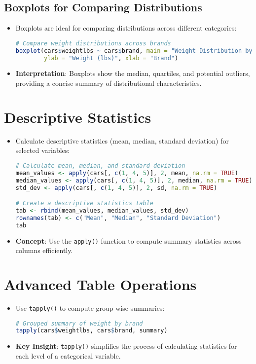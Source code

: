 \subsection{Boxplots for Comparing Distributions}
\begin{itemize}
    \item Boxplots are ideal for comparing distributions across different categories:
\begin{lstlisting}[language=R]
# Compare weight distributions across brands
boxplot(cars$weightlbs ~ cars$brand, main = "Weight Distribution by Brand",
        ylab = "Weight (lbs)", xlab = "Brand")
\end{lstlisting}
    \item \textbf{Interpretation}: Boxplots show the median, quartiles, and potential outliers, providing a concise summary of distributional characteristics.
\end{itemize}

\section{Descriptive Statistics}
\begin{itemize}
    \item Calculate descriptive statistics (mean, median, standard deviation) for selected variables:
\begin{lstlisting}[language=R]
# Calculate mean, median, and standard deviation
mean_values <- apply(cars[, c(1, 4, 5)], 2, mean, na.rm = TRUE)
median_values <- apply(cars[, c(1, 4, 5)], 2, median, na.rm = TRUE)
std_dev <- apply(cars[, c(1, 4, 5)], 2, sd, na.rm = TRUE)

# Create a descriptive statistics table
tab <- rbind(mean_values, median_values, std_dev)
rownames(tab) <- c("Mean", "Median", "Standard Deviation")
tab
\end{lstlisting}
    \item \textbf{Concept}: Use the \texttt{apply()} function to compute summary statistics across columns efficiently.
\end{itemize}

\section{Advanced Table Operations}
\begin{itemize}
    \item Use \texttt{tapply()} to compute group-wise summaries:
\begin{lstlisting}[language=R]
# Grouped summary of weight by brand
tapply(cars$weightlbs, cars$brand, summary)
\end{lstlisting}
    \item \textbf{Key Insight}: \texttt{tapply()} simplifies the process of calculating statistics for each level of a categorical variable.
\end{itemize}

